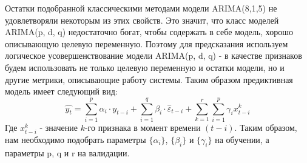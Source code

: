 \documentclass[14pt, a4paper]{extarticle}
\begin{document}
Остатки подобранной классическими методами модели ARIMA(8,1,5) не удовлетворяли некоторым из этих свойств. Это значит, что класс моделей ARIMA(p, d, q) недостаточно богат, чтобы содержать в себе модель, хорошо описывающую целевую переменную. Поэтому для предсказания используем логическое усовершенствование модели  ARIMA(p, d, q) - в качестве признаков будем использовать не только целевую переменную и остатки модели, но и другие метрики, описывающие работу системы. Таким образом предиктивная модель имеет следующий вид:
$$\hat{y_t} = \sum_{i=1}^{p}\alpha_i \cdot y_{t-i} + \sum_{i=1}^{q}\beta_i \cdot \hat{\varepsilon}_{t-i} +\sum_{k=1}^{r}\sum_{i=1}^{p}\gamma_i x_{t-i}^{k}$$
Где $x_{t-i}^{k}$ - значение $k$-го признака в момент времени $(t-i)$. Таким образом, нам необходимо подобрать параметры $\{\alpha_i\}$, $\{\beta_i\}$ и $\{\gamma_i\}$ на обучении, а параметры p, q и r на валидации. 
\end{document}
